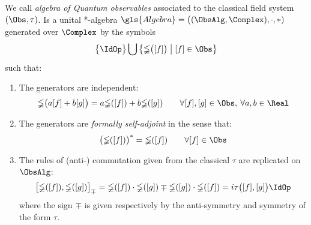 \documentclass[Main]{subfiles}
\begin{document}
		\begin{definition}\label{Def:QuantumObsAlgebra}
			We call \emph{algebra of Quantum observables} associated to the classical field system $(\Obs, \tau)$.
			Is a unital *-algebra $\gls{Algebra}= \big( (\ObsAlg, \Complex),\cdot,*)$ generated over $\Complex$ by the symbols 
			\begin{displaymath}
				\big\{\IdOp\big\}\bigcup \big\{\mathbb{\Phi}\big( [f]\big) \; \big\vert \;  [f] \in \Obs \big\}
			\end{displaymath}
			such that:
			\begin{enumerate}
				\item The generators are independent:
					\begin{equation}\label{Ip:GenIndip}
						\mathbb{\Phi} \big(a [f] + b [g] \big) = 
						a \mathbb{\Phi} ([f]) + b \mathbb{\Phi} ([g]) \qquad \forall [f],[g] \in \Obs,\: \forall a,b \in \Real
					\end{equation}
				\item The generators are \emph{formally self-adjoint} in the sense that:
					\begin{equation}\label{Ip:GenSelfAd}
						\big( \mathbb{\Phi}([f]) \big)^* = \mathbb{\Phi}([f]) \qquad \forall [f] \in \Obs
					\end{equation}
				\item The rules of (anti-) commutation given from the classical $\tau$ are replicated on $\ObsAlg$:
					\begin{equation}\label{Ip:ImplementCCR}
						\big[ \mathbb{\Phi}([f]), \mathbb{\Phi}([g]) \big]_\mp = \mathbb{\Phi}([f]) \cdot \mathbb{\Phi}([g]) \mp \mathbb{\Phi}([g]) \cdot \mathbb{\Phi}([f]) = i \tau\big( [f], [g] \big) \IdOp
					\end{equation}
					where the sign $\mp$ is given respectively by the anti-symmetry and symmetry of the form $\tau$.
			\end{enumerate}

		\end{definition}
\end{document}
